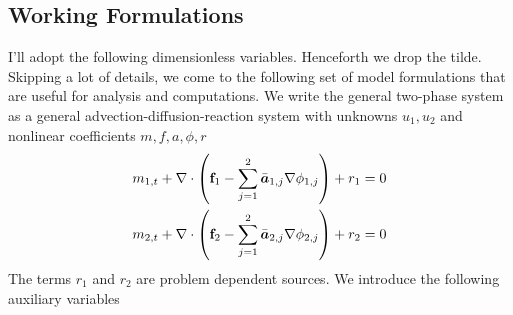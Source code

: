 \documentclass[10pt,dvips,twoside,reqno]{amsart}
\begin{document}
\subsection{Working Formulations}

I'll adopt the following dimensionless variables.
Henceforth we drop the tilde. Skipping a lot of details, we come
to the following set of model formulations that are useful for
analysis and computations. We write the general two-phase system as a
general advection-diffusion-reaction system with unknowns $u_1,u_2$
and nonlinear coefficients $m,f,a,\phi,r$
\begin{eqnarray}
m_{1,t} + \nabla \cdot \left( {\bf f}_1 - \sum_{j=1}^2 \bar{\mbox{{\boldmath ${a}$}}}_{1,j} \nabla \phi_{1,j} \right) + r_1 = 0 \\
m_{2,t} + \nabla \cdot \left( {\bf f}_2 - \sum_{j=1}^2 \bar{\mbox{{\boldmath ${a}$}}}_{2,j} \nabla \phi_{2,j} \right) + r_2 = 0 
\end{eqnarray}
The terms $r_1$ and $r_2$ are problem dependent sources. We introduce the following auxiliary variables 
\end{document}
